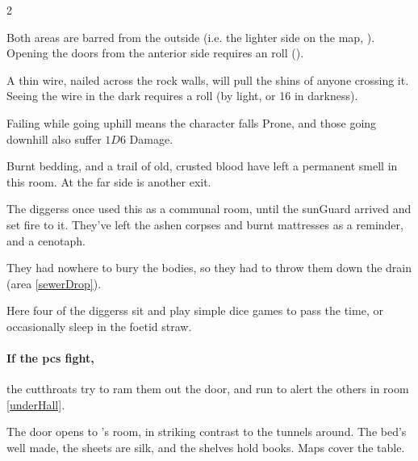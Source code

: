 \begin{multicols}{2}


Both areas are barred from the outside (i.e. the lighter side on the map, ).
Opening the doors from the anterior side requires an  roll (\tn[10]).

A thin wire, nailed across the rock walls, will pull the shins of anyone crossing it.
Seeing the wire in the dark requires a  roll (\tn[12] by light, or 16 in darkness).

Failing while going uphill means the character falls Prone,%
and those going downhill also suffer $1D6$ Damage.


\begin{boxtext}
  Burnt bedding, and a trail of old, crusted blood have left a permanent smell in this room.
  At the far side is another exit.
\end{boxtext}

\begin{exampletext}
  The \glspl{diggers} once used this as a communal room, until the \gls{sunGuard} arrived and set fire to it.
  They've left the ashen corpses and burnt mattresses as a reminder, and a cenotaph.

  They had nowhere to bury the bodies, so they had to throw them down the drain (\gls{area} \vref{sewerDrop}).
\end{exampletext}


Here four of the \glspl{diggers} sit and play simple dice games to pass the time, or occasionally sleep in the foetid straw.

\paragraph{If the \glspl{pc} fight,}
the cutthroats try to ram them out the door, and run to alert the others in room \ref{underHall}.


\label{sewerKingRoom}

\begin{boxtext}
  The door opens to 's room, in striking contrast to the tunnels around.
  The bed's well made, the sheets are silk, and the shelves hold books.
  Maps cover the table.
\end{boxtext}


\end{multicols}
